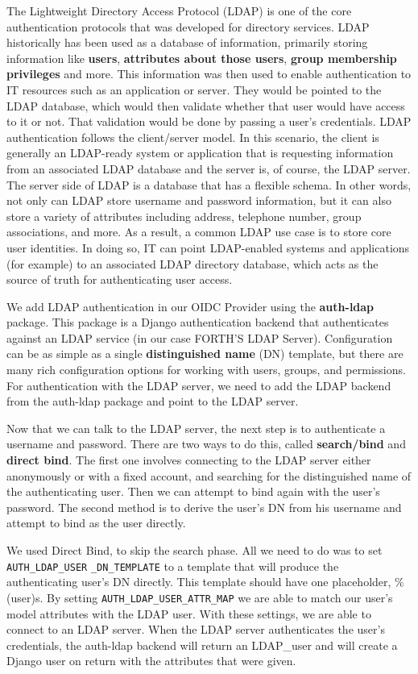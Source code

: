 The Lightweight Directory Access Protocol (LDAP) is one of the core authentication protocols that was developed for directory services. LDAP historically has been used as a database of information, primarily storing information like \textbf{users}, \textbf{attributes about those users}, \textbf{group membership privileges} and more. This information was then used to enable authentication to IT resources such as an application or server. They would be pointed to the LDAP database, which would then validate whether that user would have access to it or not. That validation would be done by passing a user’s credentials. LDAP authentication follows the client/server model. In this scenario, the client is generally an LDAP-ready system or application that is requesting information from an associated LDAP database and the server is, of course, the LDAP server. The server side of LDAP is a database that has a flexible schema. In other words, not only can LDAP store username and password information, but it can also store a variety of attributes including address, telephone number, group associations, and more. As a result, a common LDAP use case is to store core user identities. In doing so, IT can point LDAP-enabled systems and applications (for example) to an associated LDAP directory database, which acts as the source of truth for authenticating user access.

We add LDAP authentication in our OIDC Provider using the \textbf{auth-ldap} \cite{ldapauth} package. This package is a Django authentication backend that authenticates against an LDAP service (in our case FORTH'S LDAP Server). Configuration can be as simple as a single \textbf{distinguished name} (DN) template, but there are many rich configuration options for working with users, groups, and permissions. For authentication with the LDAP server, we need to add the LDAP backend from the auth-ldap package and point to the LDAP server.

Now that we can talk to the LDAP server, the next step is to authenticate a username and password. There are two ways to do this, called \textbf{search/bind} and \textbf{direct bind}. The first one involves connecting to the LDAP server either anonymously or with a fixed account, and searching for the distinguished name of the authenticating user. Then we can attempt to bind again with the user’s password. The second method is to derive the user’s DN from his username and attempt to bind as the user directly.

We used Direct Bind, to skip the search phase. All we need to do was to set \verb|AUTH_LDAP_USER| \verb|_DN_TEMPLATE| to a template that will produce the authenticating user’s DN directly. This template should have one placeholder, \%(user)s. By setting \verb|AUTH_LDAP_USER_ATTR_MAP| we are able to match our user's model attributes with the LDAP user.
With these settings, we are able to connect to an LDAP server. When the LDAP server authenticates the user's credentials, the auth-ldap backend will return an LDAP\_user and will create a Django user on return with the attributes that were given.

